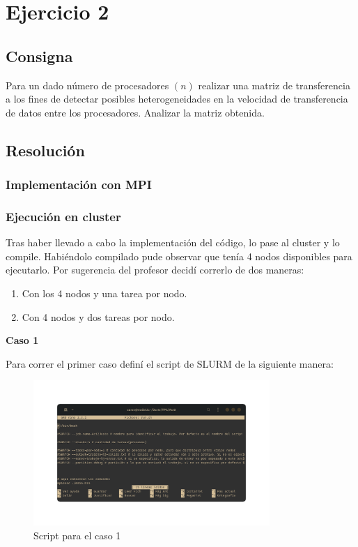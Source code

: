 \graphicspath{{Images/}}

\section{Ejercicio 2}

\subsection{Consigna}
Para un dado número de procesadores $(n)$ realizar una matriz de transferencia a los fines de detectar posibles heterogeneidades en la velocidad de transferencia de datos entre los procesadores. Analizar la matriz obtenida.

\subsection{Resolución}

\subsubsection{Implementación con MPI}




\subsubsection{Ejecución en cluster}
Tras haber llevado a cabo la implementación del código, lo pase al cluster y lo compile. Habiéndolo compilado pude observar que tenía 4 nodos disponibles para ejecutarlo. Por sugerencia del profesor decidí correrlo de dos maneras:
\begin{enumerate}
  \item Con los 4 nodos y una tarea por nodo.
  \item Con 4 nodos y dos tareas por nodo.
\end{enumerate}

\textbf{Caso 1}

Para correr el primer caso definí el script de SLURM de la siguiente manera:
\begin{figure}[H]
    \centering
    \includegraphics[width=0.80\textwidth]{Images/ej2/scriptcaso1.png}
    \caption{Script para el caso 1}
    \label{fig:scriptcaso1}
\end{figure}

